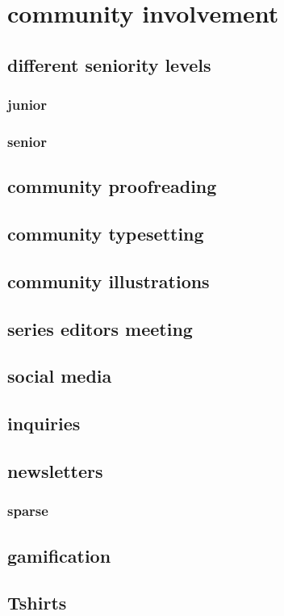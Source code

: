 \documentclass[output=guidelines,guidelines] {langscibook}
\begin{document}
\section{community involvement}
\subsection{different seniority levels}
\subsubsection{junior}
\subsubsection{senior}
\subsection{community proofreading}
\subsection{community typesetting}
\subsection{community illustrations}
\subsection{series editors meeting}
\subsection{social media}
\subsection{inquiries}
\subsection{newsletters}
\subsubsection{sparse}
\subsection{gamification}
\subsection{Tshirts}
\end{document}
